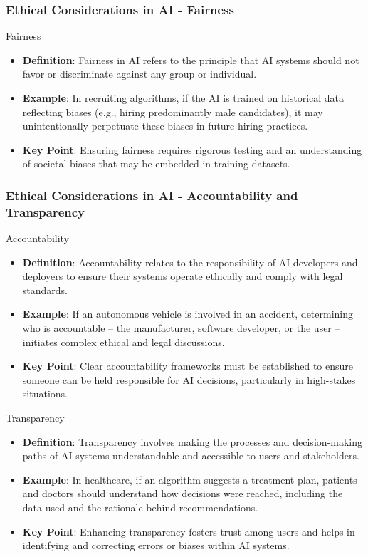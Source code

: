 \documentclass[aspectratio=169]{beamer}
\begin{document}
\begin{frame}[fragile]
    \frametitle{Ethical Considerations in AI - Fairness}
    \begin{block}{Fairness}
        \begin{itemize}
            \item \textbf{Definition}: Fairness in AI refers to the principle that AI systems should not favor or discriminate against any group or individual.
            \item \textbf{Example}: In recruiting algorithms, if the AI is trained on historical data reflecting biases (e.g., hiring predominantly male candidates), it may unintentionally perpetuate these biases in future hiring practices.
            \item \textbf{Key Point}: Ensuring fairness requires rigorous testing and an understanding of societal biases that may be embedded in training datasets.
        \end{itemize}
    \end{block}
\end{frame}

\begin{frame}[fragile]
    \frametitle{Ethical Considerations in AI - Accountability and Transparency}
    \begin{block}{Accountability}
        \begin{itemize}
            \item \textbf{Definition}: Accountability relates to the responsibility of AI developers and deployers to ensure their systems operate ethically and comply with legal standards.
            \item \textbf{Example}: If an autonomous vehicle is involved in an accident, determining who is accountable – the manufacturer, software developer, or the user – initiates complex ethical and legal discussions.
            \item \textbf{Key Point}: Clear accountability frameworks must be established to ensure someone can be held responsible for AI decisions, particularly in high-stakes situations.
        \end{itemize}
    \end{block}

    \begin{block}{Transparency}
        \begin{itemize}
            \item \textbf{Definition}: Transparency involves making the processes and decision-making paths of AI systems understandable and accessible to users and stakeholders.
            \item \textbf{Example}: In healthcare, if an algorithm suggests a treatment plan, patients and doctors should understand how decisions were reached, including the data used and the rationale behind recommendations.
            \item \textbf{Key Point}: Enhancing transparency fosters trust among users and helps in identifying and correcting errors or biases within AI systems.
        \end{itemize}
    \end{block}
\end{frame}
\end{document}
